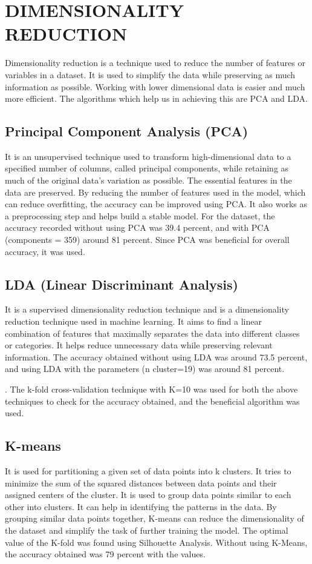 \documentclass[conference]{IEEEtran}
\begin{document}
\section{DIMENSIONALITY REDUCTION}
Dimensionality reduction is a technique used to reduce the number of features or variables in a dataset. It is used to simplify the data while preserving as much information as possible. Working with lower dimensional data is easier and much more efficient. The algorithms which help us in achieving this are PCA and LDA.

\subsection{Principal Component Analysis (PCA)}\label{AA}
It is an unsupervised technique used to transform high-dimensional data to a specified number of columns, called principal components, while retaining as much of the original data's variation as possible. The essential features in the data are preserved. By reducing the number of features used in the model, which can reduce overfitting, the accuracy can be improved using PCA. It also works as a preprocessing step and helps build a stable model.
For the dataset, the accuracy recorded without using PCA was 39.4 percent, and with PCA (components = 359) around 81 percent. Since PCA was beneficial for overall accuracy, it was used.


\subsection{LDA (Linear Discriminant Analysis)}\label{AA}
It is a supervised dimensionality reduction technique and is a dimensionality reduction technique used in machine learning. It aims to find a linear combination of features that maximally separates the data into different classes or categories. It helps reduce unnecessary data while preserving relevant information.
The accuracy obtained without using LDA was around 73.5 percent, and using LDA with the parameters (n cluster=19) was around 81 percent.


.\newline
The k-fold cross-validation technique with K=10 was used for both the above techniques to check for the accuracy obtained, and the beneficial algorithm was used.

\subsection{K-means}\label{AA}
It is used for partitioning a given set of data points into k clusters. It tries to minimize the sum of the squared distances between data points and their assigned centers of the cluster. It is used to group data points similar to each other into clusters. It can help in identifying the patterns in the data. By grouping similar data points together, K-means can reduce the dimensionality of the dataset and simplify the task of further training the model. The optimal value of the K-fold was found using Silhouette Analysis.
Without using K-Means, the accuracy obtained was 79 percent with the values. 
\end{document}
